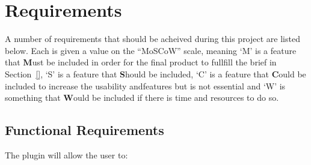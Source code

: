 
\onecolumn
\section{Requirements}
\label{sec:requirements}

A number of requirements that should be acheived during this project are listed
below. Each is given a value on the ``MoSCoW'' scale, meaning `M' is a feature
that \textbf{M}ust be included in order for the final product to fullfill the
brief in Section~\ref{}, `S' is a feature that \textbf{S}hould be included, `C'
is a feature that \textbf{C}ould be included to increase the usability
andfeatures but is not essential and `W' is something that \textbf{W}ould be
included if there is time and resources to do so.

\subsection{Functional Requirements}
\label{sub:functional_requirements}

The plugin will allow the user to:

